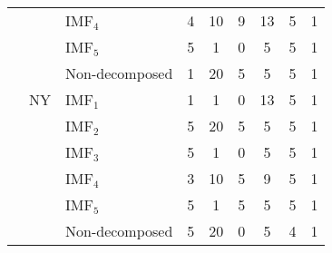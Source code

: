 {\begin{longtable}[htb!]{cclc|cc|c|c|c}
                      &                     & IMF$_4$        & 4 & 10 & 9 & 13 & 5 & 1 \\
                      &                     & IMF$_5$        & 5 & 1  & 0 & 5  & 5 & 1 \\
                      &                     & Non-decomposed & 1 & 20 & 5 & 5  & 5 & 1 \\ \cline{2-9}
                      & {NY} & IMF$_1$        & 1 & 1  & 0 & 13 & 5 & 1 \\
                      &                     & IMF$_2$        & 5 & 20 & 5 & 5  & 5 & 1 \\
                      &                     & IMF$_3$        & 5 & 1  & 0 & 5  & 5 & 1 \\
                      &                     & IMF$_4$        & 3 & 10 & 5 & 9  & 5 & 1 \\
                      &                     & IMF$_5$        & 5 & 1  & 5 & 5  & 5 & 1 \\
                      &                     & Non-decomposed & 5 & 20 & 0 & 5  & 4 & 1 \\ \hline
\end{longtable}
}